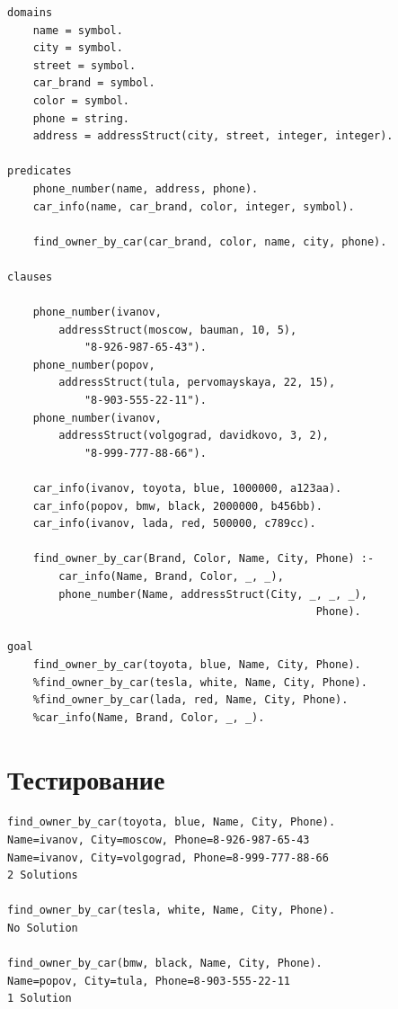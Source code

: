 \begin{center}
    \captionsetup{justification=raggedright,singlelinecheck=off}
    \begin{lstlisting}[label=lst:brt,caption=Код программы]
domains
    name = symbol.
    city = symbol.
    street = symbol.
    car_brand = symbol.
    color = symbol.
    phone = string.
    address = addressStruct(city, street, integer, integer).

predicates
    phone_number(name, address, phone).
    car_info(name, car_brand, color, integer, symbol).

    find_owner_by_car(car_brand, color, name, city, phone).

clauses

    phone_number(ivanov,
        addressStruct(moscow, bauman, 10, 5),
            "8-926-987-65-43").
    phone_number(popov,
        addressStruct(tula, pervomayskaya, 22, 15),
            "8-903-555-22-11").
    phone_number(ivanov,
        addressStruct(volgograd, davidkovo, 3, 2),
            "8-999-777-88-66").

    car_info(ivanov, toyota, blue, 1000000, a123aa).
    car_info(popov, bmw, black, 2000000, b456bb).
    car_info(ivanov, lada, red, 500000, c789cc).

    find_owner_by_car(Brand, Color, Name, City, Phone) :-
        car_info(Name, Brand, Color, _, _),
        phone_number(Name, addressStruct(City, _, _, _),
                                                Phone).

goal
	find_owner_by_car(toyota, blue, Name, City, Phone).
	%find_owner_by_car(tesla, white, Name, City, Phone).
	%find_owner_by_car(lada, red, Name, City, Phone).
	%car_info(Name, Brand, Color, _, _).
    \end{lstlisting}
\end{center}

\chapter*{Тестирование}
\begin{center}
    \captionsetup{justification=raggedright,singlelinecheck=off}
    \begin{lstlisting}[label=lst:brute_fRRRorce,caption=Тестирование]
find_owner_by_car(toyota, blue, Name, City, Phone).
Name=ivanov, City=moscow, Phone=8-926-987-65-43
Name=ivanov, City=volgograd, Phone=8-999-777-88-66
2 Solutions

find_owner_by_car(tesla, white, Name, City, Phone).
No Solution

find_owner_by_car(bmw, black, Name, City, Phone).
Name=popov, City=tula, Phone=8-903-555-22-11
1 Solution
    \end{lstlisting}
\end{center}

